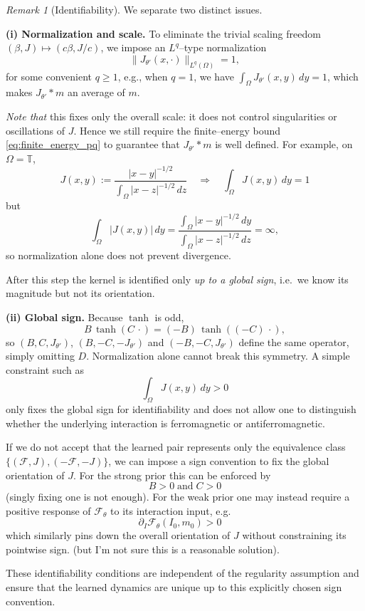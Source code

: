 \documentclass[11pt,a4paper]{article}
\theoremstyle{plain}
\theoremstyle{definition}
\theoremstyle{remark}
\newtheorem{remark}[theorem]{Remark}
\begin{document}
\begin{remark}[Identifiability]
	We separate two distinct issues.

	\smallskip
	\noindent\textbf{(i) Normalization and scale.}
	To eliminate the trivial scaling freedom
	\((\beta,J)\mapsto (c\beta,J/c)\),
	we impose an $L^{q}$–type normalization
	\[
		\|J_{\theta'}(x,\cdot)\|_{L^{q}(\Omega)} = 1 ,
	\]
	for some convenient $q\ge 1$, e.g., when $q=1$, we have $\int_\Omega J_{\theta'}(x,y)\,dy = 1$, which makes $J_{\theta'}*m$ an average of $m$.


	\emph{Note that} this fixes only the overall scale: it does not control
	singularities or oscillations of $J$. Hence we still require the finite–energy bound \eqref{eq:finite_energy_pq}
	to guarantee that $J_{\theta'}*m$ is well defined.
	For example, on $\Omega=\mathbb T$,
	\[
		J(x,y)
		:= \frac{|x-y|^{-1/2}}
		{\displaystyle \int_\Omega |x-z|^{-1/2}\,dz}
		\quad\Rightarrow\quad
		\int_\Omega J(x,y)\,dy = 1
	\]
	but
	\[
		\int_\Omega |J(x,y)|\,dy
		= \frac{\displaystyle \int_\Omega |x-y|^{-1/2}\,dy}
		{\displaystyle \int_\Omega |x-z|^{-1/2}\,dz}
		= \infty,
	\]
	so normalization alone does not prevent divergence.

	After this step the kernel is identified only
	\emph{up to a global sign}, i.e.\ we know its
	magnitude but not its orientation.

	\smallskip
	\noindent\textbf{(ii) Global sign.}
	Because $\tanh$ is odd,
	\[
		B\,\tanh(C\,\cdot)
		= (-B)\,\tanh((-C)\,\cdot),
	\]
	so $(B,C,J_{\theta'})$, $(B,-C,-J_{\theta'})$ and $(-B,-C, J_{\theta'})$
	define the same operator, simply omitting $D$.
	Normalization alone cannot break this symmetry. A simple constraint such as
	\[
		\int_\Omega J(x,y)\,dy > 0
	\]
	only fixes the global sign for identifiability and does not allow one to
	distinguish whether the underlying interaction is ferromagnetic or antiferromagnetic.

	If we do not accept that the learned pair
	represents only the equivalence class
	$\{(\mathcal F,J),(-\mathcal F,-J)\}$,
	we can impose a sign convention to fix the global orientation of $J$.
	For the strong prior this can be enforced by
	\[
		B>0 \;\text{and}\; C>0
	\]
	(singly fixing one is not enough).
	For the weak prior one may instead require a positive response of
	$\mathcal F_\theta$ to its interaction input, e.g.
	\[
		\partial_I \mathcal F_\theta(I_0,m_0) > 0
		\quad
	\]
	which similarly pins down the overall orientation of $J$
	without constraining its pointwise sign. (but I'm not sure this is a reasonable solution).



	\smallskip
	These identifiability conditions are independent of
	the regularity assumption and ensure that the learned
	dynamics are unique up to this explicitly chosen
	sign convention.
\end{remark}
\end{document}
